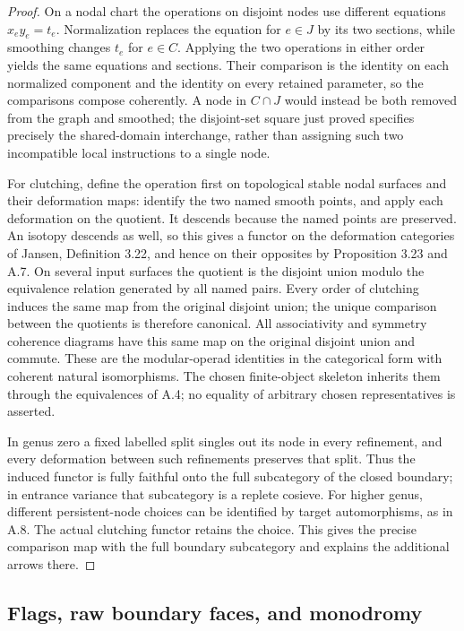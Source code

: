 \begin{proof}
On a nodal chart the operations on disjoint nodes use different equations $x_e y_e=t_e$. Normalization replaces the equation for $e\in J$ by its two sections, while smoothing changes $t_e$ for $e\in C$. Applying the two operations in either order yields the same equations and sections. Their comparison is the identity on each normalized component and the identity on every retained parameter, so the comparisons compose coherently. A node in $C\cap J$ would instead be both removed from the graph and smoothed; the disjoint-set square just proved specifies precisely the shared-domain interchange, rather than assigning such two incompatible local instructions to a single node.

For clutching, define the operation first on topological stable nodal surfaces and their deformation maps: identify the two named smooth points, and apply each deformation on the quotient. It descends because the named points are preserved. An isotopy descends as well, so this gives a functor on the deformation categories of Jansen, Definition 3.22, and hence on their opposites by Proposition 3.23 and A.7. On several input surfaces the quotient is the disjoint union modulo the equivalence relation generated by all named pairs. Every order of clutching induces the same map from the original disjoint union; the unique comparison between the quotients is therefore canonical. All associativity and symmetry coherence diagrams have this same map on the original disjoint union and commute. These are the modular-operad identities in the categorical form with coherent natural isomorphisms. The chosen finite-object skeleton inherits them through the equivalences of A.4; no equality of arbitrary chosen representatives is asserted.

In genus zero a fixed labelled split singles out its node in every refinement, and every deformation between such refinements preserves that split. Thus the induced functor is fully faithful onto the full subcategory of the closed boundary; in entrance variance that subcategory is a replete cosieve. For higher genus, different persistent-node choices can be identified by target automorphisms, as in A.8. The actual clutching functor retains the choice. This gives the precise comparison map with the full boundary subcategory and explains the additional arrows there.
\end{proof}

\subsection{Flags, raw boundary faces, and monodromy}

